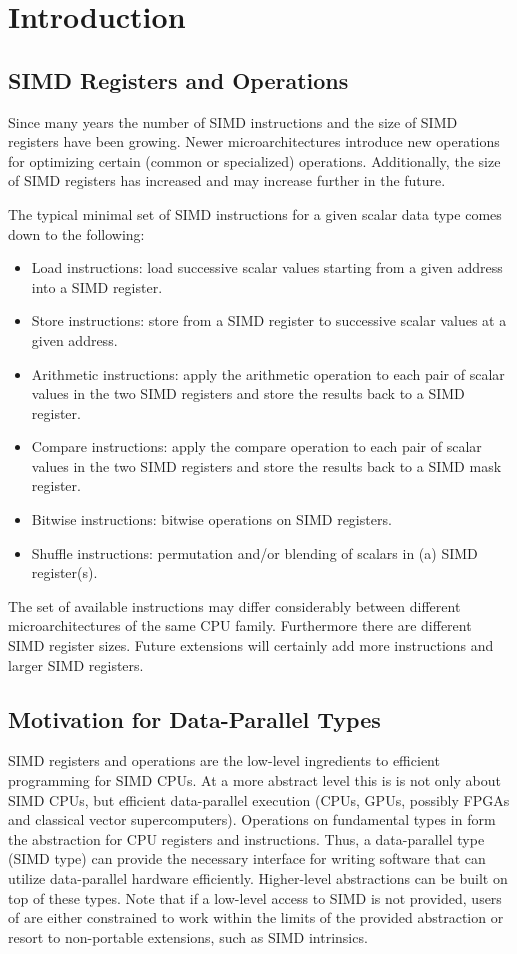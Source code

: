 \section{Introduction}

\subsection{SIMD Registers and Operations}
Since many years the number of SIMD instructions and the size of SIMD registers have been growing.
Newer microarchitectures introduce new operations for optimizing certain (common or specialized) operations.
Additionally, the size of SIMD registers has increased and may increase further in the future.

The typical minimal set of SIMD instructions for a given scalar data type comes down to the following:
\begin{itemize}
  \item Load instructions: load  successive scalar values starting from a given address into a SIMD register.
  \item Store instructions: store from a SIMD register to  successive scalar values at a given address.
  \item Arithmetic instructions: apply the arithmetic operation to each pair of scalar values in the two SIMD registers and store the results back to a SIMD register.
  \item Compare instructions: apply the compare operation to each pair of scalar values in the two SIMD registers and store the results back to a SIMD mask register.
  \item Bitwise instructions: bitwise operations on SIMD registers.
  \item Shuffle instructions: permutation and/or blending of scalars in (a) SIMD register(s).
\end{itemize}

The set of available instructions may differ considerably between different microarchitectures of the same CPU family.
Furthermore there are different SIMD register sizes.
Future extensions will certainly add more instructions and larger SIMD registers.

\subsection{Motivation for Data-Parallel Types}
SIMD registers and operations are the low-level ingredients to efficient programming for SIMD CPUs.
At a more abstract level this is is not only about SIMD CPUs, but efficient data-parallel execution (CPUs, GPUs, possibly FPGAs and classical vector supercomputers).
Operations on fundamental types in \CC{} form the abstraction for CPU registers and instructions.
Thus, a data-parallel type (SIMD type) can provide the necessary interface for writing software that can utilize data-parallel hardware efficiently.
Higher-level abstractions can be built on top of these types.
Note that if a low-level access to SIMD is not provided, users of \CC{} are either constrained to work within the limits of the provided abstraction or resort to non-portable extensions, such as SIMD intrinsics.

